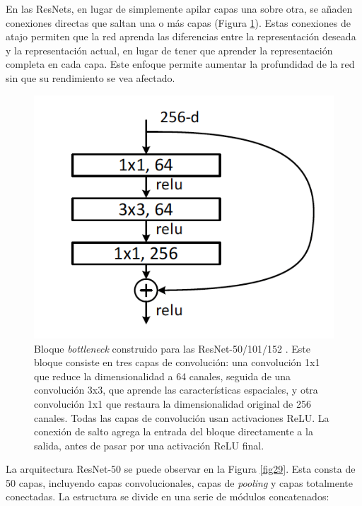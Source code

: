 En las ResNets, en lugar de simplemente apilar capas una sobre otra, se añaden conexiones directas que saltan una o más capas (Figura \ref{fig28}). Estas conexiones de atajo permiten que la red aprenda las diferencias entre la representación deseada y la representación actual, en lugar de tener que aprender la representación completa en cada capa. Este enfoque permite aumentar la profundidad de la red sin que su rendimiento se vea afectado.

\begin{figure}[h]
	\centering
	\includegraphics[scale=0.65]{imagenes/cap4/residual_conections.png}
	\caption[Bloque residual ResNet.]{Bloque \textit{bottleneck} construido para las ResNet-50/101/152 \cite{73}. Este bloque consiste en tres capas de convolución: una convolución 1x1 que reduce la dimensionalidad a 64 canales, seguida de una convolución 3x3, que aprende las características espaciales, y otra convolución 1x1 que restaura la dimensionalidad original de 256 canales. Todas las capas de convolución usan activaciones ReLU. La conexión de salto agrega la entrada del bloque directamente a la salida, antes de pasar por una activación ReLU final.}
	\label{fig28}
\end{figure}

La arquitectura ResNet-50 se puede observar en la Figura \ref{fig29}. Esta consta de 50 capas, incluyendo capas convolucionales, capas de \textit{pooling} y capas totalmente conectadas. La estructura se divide en una serie de módulos concatenados:

